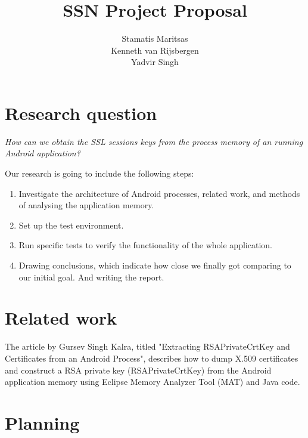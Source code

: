 \documentclass[11pt]{article}
\title{\textbf{SSN Project Proposal}}
\author{Stamatis Maritsas\\
		Kenneth van Rijsbergen\\
		Yadvir Singh}
\date{}
\begin{document}
\maketitle




\section{Research question}

\begin{framed}
\noindent \textit{How can we obtain the SSL sessions keys from the process memory of an running Android application?}
\end{framed}
Our research is going to include the following steps:

\begin{enumerate}
\item{Investigate the architecture of Android processes, related work, and methods of analysing the application memory.}
\item{Set up the test environment.}
\item{Run specific tests to verify the functionality of the whole application.}
\item{Drawing conclusions, which indicate how close we finally got comparing to our initial goal. And writing the report.}
\end{enumerate}

\clearpage

\section{Related work}
The article by Gursev Singh Kalra, titled "Extracting RSAPrivateCrtKey and Certificates from an Android Process", describes how to dump X.509 certificates and construct a RSA private key (RSAPrivateCrtKey) from the Android application memory using Eclipse Memory Analyzer Tool (MAT) and Java code.\cite{cite1}

\section{Planning}
\end{document}

